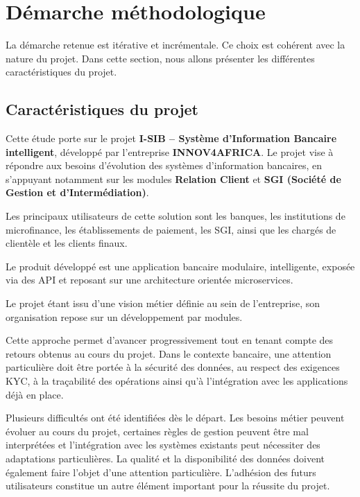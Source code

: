 \section{Démarche méthodologique}

La démarche retenue est itérative et incrémentale. Ce choix est cohérent avec
la nature du projet. Dans cette section, nous allons présenter les différentes
caractéristiques du projet.


\subsection{Caractéristiques du projet}


Cette étude porte sur le projet \textbf{I-SIB – Système d'Information Bancaire intelligent}, développé par l'entreprise \textbf{INNOV4AFRICA}. Le projet vise à répondre aux besoins d'évolution des systèmes d'information bancaires, en s'appuyant notamment sur les modules \textbf{Relation Client} et \textbf{SGI (Société de Gestion et d'Intermédiation)}.

Les principaux utilisateurs de cette solution sont les banques, les institutions de microfinance, les établissements de paiement, les SGI, ainsi que les chargés de clientèle et les clients finaux.


Le produit développé est une application bancaire modulaire, intelligente, exposée via des API  et reposant sur une architecture orientée microservices.

Le projet étant issu d'une vision métier définie au sein de l'entreprise, son organisation repose sur un développement par modules.

Cette approche permet d'avancer progressivement tout en tenant compte des retours obtenus au cours du projet. Dans le contexte bancaire, une attention particulière doit être portée à la sécurité des données, au respect des exigences KYC, à la traçabilité des opérations ainsi qu'à l'intégration avec les applications déjà en place.

Plusieurs difficultés ont été identifiées dès le départ. Les besoins métier peuvent évoluer au cours du projet, certaines règles de gestion peuvent être mal interprétées et l'intégration avec les systèmes existants peut nécessiter des adaptations particulières.
La qualité et la disponibilité des données doivent également faire l'objet d'une attention particulière. L'adhésion des futurs utilisateurs constitue un autre élément important pour la réussite du projet.

